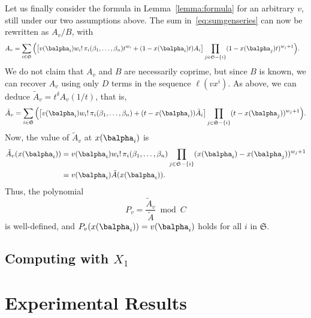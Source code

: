 \documentclass[12pt]{article}
\begin{document}
Let us finally consider the formula in Lemma~\ref{lemma:formula} 
for an arbitrary $v$, still under our two assumptions above. 
The sum in~\eqref{eq:sumgenseries} can now be rewritten as $A_v/B$, with
\begin{align*}
A_v&=\sum_{i \in \mathfrak{S}} \Big(\big[
v(\balpha_i) w_i!\, \pi_{i}(\beta_1,\dots,\beta_n)
t^{w_i} + (1-x(\balpha_i)    t)A_i\big]
\prod_{j \in \mathfrak{S}-\{i\}}(1-x(\balpha_j) t)^{w_{j}+1}\Big).
\end{align*}
We do not claim that $A_v$ and $B$ are necessarily coprime, but
since $B$ is known, we can recover $A_v$ using only $D$ 
terms in the sequence $\ell(v x^i)$. As above, we can deduce
$\tilde A_v
= t^{\delta}A_v(1/t)$, that is,
$$\tilde A_v = 
\sum_{i \in \mathfrak{S}} \Big(\big[
v(\balpha_i) w_i!\, \pi_{i}(\beta_1,\dots,\beta_n) + (t-x(\balpha_i)  )\tilde A_i\big]
\prod_{j \in \mathfrak{S}-\{i\}}(t-x(\balpha_j) )^{w_{j}+1}\Big).$$
Now, the value of $\tilde A_v$ at $x(\balpha_i)$ is
\begin{align*}
\tilde A_v(x(\balpha_i))&=v(\balpha_i) w_i!\, \pi_{i}(\beta_1,\dots,\beta_n)\prod_{j \in
	\mathfrak{S}-\{i\}}(x(\balpha_i)-x(\balpha_j) )^{w_{j}+1}\\
&= v(\balpha_i) \tilde A(x(\balpha_i)).
\end{align*}
Thus, the polynomial 
$$P_v = \frac{\tilde A_v}{\tilde A} \bmod C$$
is well-defined, and $P_v(x(\balpha_i))=v(\balpha_i)$ holds for all $i$ in $\mathfrak{S}$.

\subsection{Computing with $X_1$}

\newpage
\section{Experimental Results}

\newpage


\end{document}
